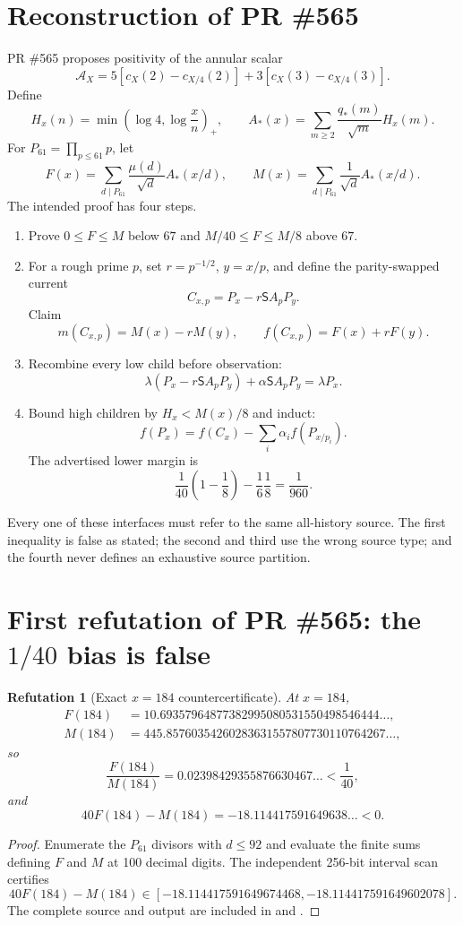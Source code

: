 \documentclass[11pt]{article}
\newtheorem{refutation}[theorem]{Refutation}
\newcommand{\1}{\mathbf 1}
\newcommand{\Astar}{A_{\!*}}
\newcommand{\qstar}{q_{\!*}}
\begin{document}
\section{Reconstruction of PR \#565}

PR \#565 proposes positivity of the annular scalar
\[
\mathcal A_X=5[c_X(2)-c_{X/4}(2)]+3[c_X(3)-c_{X/4}(3)].
\]
Define
\[
H_x(n)=\min\!\left(\log4,\log\frac xn\right)_+,
\qquad
\Astar(x)=\sum_{m\ge2}\frac{\qstar(m)}{\sqrt m}H_x(m).
\]
For $P_{61}=\prod_{p\le61}p$, let
\[
F(x)=\sum_{d\mid P_{61}}\frac{\mu(d)}{\sqrt d}\Astar(x/d),
\qquad
M(x)=\sum_{d\mid P_{61}}\frac1{\sqrt d}\Astar(x/d).
\]
The intended proof has four steps.

\begin{enumerate}[label=\textbf{565.\arabic*.}]
\item Prove $0\le F\le M$ below $67$ and $M/40\le F\le M/8$ above $67$.
\item For a rough prime $p$, set $r=p^{-1/2}$, $y=x/p$, and define the parity-swapped current
\[
C_{x,p}=P_x-r\mathsf S A_pP_y.
\]
Claim
\[
m(C_{x,p})=M(x)-rM(y),\qquad f(C_{x,p})=F(x)+rF(y).
\]
\item Recombine every low child before observation:
\[
\lambda(P_x-r\mathsf SA_pP_y)+\alpha\mathsf SA_pP_y=\lambda P_x.
\]
\item Bound high children by $H_x<M(x)/8$ and induct:
\[
f(P_x)=f(C_x)-\sum_i\alpha_if(P_{x/p_i}).
\]
The advertised lower margin is
\[
\frac1{40}\left(1-\frac18\right)-\frac16\frac18=\frac1{960}.
\]
\end{enumerate}

Every one of these interfaces must refer to the same all-history source.  The first inequality is false as stated; the second and third use the wrong source type; and the fourth never defines an exhaustive source partition.

\section{First refutation of PR \#565: the $1/40$ bias is false}

\begin{refutation}[Exact $x=184$ countercertificate]\label{ref:x184}
At $x=184$,
\begin{align*}
F(184)&=10.69357964877382995080531550498546444\ldots,\\
M(184)&=445.85760354260283631557807730110764267\ldots,
\end{align*}
so
\[
\frac{F(184)}{M(184)}=0.02398429355876630467\ldots<\frac1{40},
\]
and
\[
40F(184)-M(184)=-18.114417591649638\ldots<0.
\]
\end{refutation}
\begin{proof}
Enumerate the $P_{61}$ divisors with $d\le92$ and evaluate the finite sums defining $F$ and $M$ at 100 decimal digits.  The independent 256-bit interval scan certifies
\[
40F(184)-M(184)\in
[-18.114417591649674468,-18.114417591649602078].
\]
The complete source and output are included in  and .
\end{proof}
\end{document}
